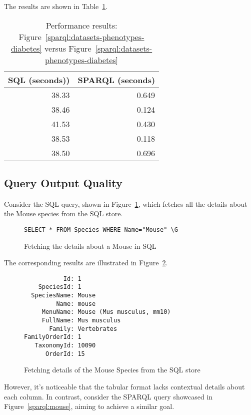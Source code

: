The results are shown in Table~\ref{table:perf-3}.

\begin{table}[H]
\begin{tabular}{rr}
SQL (seconds)) & SPARQL (seconds)\\[0pt]
\toprule
38.33 & 0.649\\[0pt]
38.46 & 0.124\\[0pt]
41.53 & 0.430\\[0pt]
38.53 & 0.118\\[0pt]
38.50 & 0.696\\[0pt]
\end{tabular}
\caption{Performance results: Figure~\ref{sparql:datasets-phenotypes-diabetes} versus Figure~\ref{sparql:datasets-phenotypes-diabetes} }\label{table:perf-3}
\end{table}

\subsection{Query Output Quality}

Consider the SQL query, shown in Figure~\ref{sql:mouse}, which fetches all the details about the Mouse species from the SQL store.

\begin{figure}[H]
\centering
\begin{verbatim}
SELECT * FROM Species WHERE Name="Mouse" \G
\end{verbatim}
\caption{Fetching the details about a Mouse in SQL}\label{sql:mouse}
\end{figure}

The corresponding results are illustrated in Figure~\ref{sql:mouse-results}.

\begin{figure}[H]
\centering
\begin{verbatim}
           Id: 1
    SpeciesId: 1
  SpeciesName: Mouse
         Name: mouse
     MenuName: Mouse (Mus musculus, mm10)
     FullName: Mus musculus
       Family: Vertebrates
FamilyOrderId: 1
   TaxonomyId: 10090
      OrderId: 15
\end{verbatim}
\caption{Fetching details of the Mouse Species from the SQL store}\label{sql:mouse-results}
\end{figure}

However, it's noticeable that the tabular format lacks contextual details about each column. In contrast, consider the SPARQL query showcased in Figure~\ref{sparql:mouse}, aiming to achieve a similar goal.

